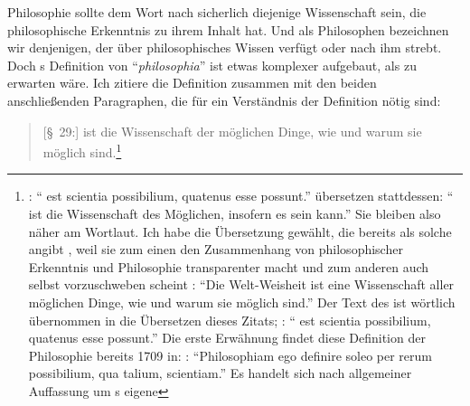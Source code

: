 Philosophie sollte dem Wort nach sicherlich diejenige Wissenschaft sein, die
philosophische Erkenntnis zu ihrem Inhalt hat. Und als Philosophen
bezeichnen wir denjenigen, der über philosophisches Wissen verfügt oder nach ihm
strebt. Doch s
Definition von \enquote{\emph{philosophia}} ist etwas komplexer aufgebaut, als
zu erwarten wäre. Ich zitiere die Definition zusammen mit den beiden
anschließenden Paragraphen, die für ein Verständnis der Definition nötig sind:
\begin{quote}
  {[\S~29:]}  ist die Wissenschaft der möglichen
  Dinge, wie und warum sie möglich
  sind.\footnote{\label{Anmerkung:UebersetzungDefinitioPhilosophieWolffDiscursus}\Cite[][\S~29]{Wolff:Discursuspraeliminarisdephilosophiaingenere1996}:
  \enquote{ est scientia possibilium, quatenus esse
  possunt.}  übersetzen stattdessen:
  \enquote{ ist die Wissenschaft des Möglichen, insofern es
  sein kann.} Sie bleiben also näher am Wortlaut. Ich habe die Übersetzung
  gewählt, die bereits
  als solche angibt
  \parencite[vgl.][\S~29]{Stiebritz:ErlaeuterungenderVernuenftigenGedanckenvondenKraefftendesmenschlichenVerstandesWolffs1977},
  weil sie zum einen den Zusammenhang von philosophischer Erkenntnis und
  Philosophie transparenter macht und zum anderen auch
   selbst
  vorzuschweben scheint \parencite[vgl.][Vorbericht, \S~1]{Wolff:VernuenftigeGedankenvondenKraeftendesmenschlichenVerstandesundihremrichtigenGebraucheinErkenntnisderWahrheit1978}:
  \enquote{Die Welt-Weisheit ist eine Wissenschaft aller möglichen Dinge, wie
  und warum sie möglich sind.} Der Text des  ist
  wörtlich übernommen in die Übersetzen dieses Zitats; \cite[vgl.][Prolegomena,
  \S~1]{Wolff:Cogitationesrationalesdeviribusintellectushumani1983}:
  \enquote{ est scientia possibilium, quatenus esse
  possunt.} Die erste Erwähnung findet diese Definition der Philosophie bereits
  1709 in:
  \cite[][Praefatio]{Wolff:AerometriaeelementainquibusaliquotAerisviresacproprietatesjuxtamethodumGeometrarumdemonstrantur1981}:
  \enquote{Philosophiam ego definire soleo per rerum possibilium, qua talium,
  scientiam.} Es handelt sich nach allgemeiner Auffassung um
  s eigene
}
\end{quote}
